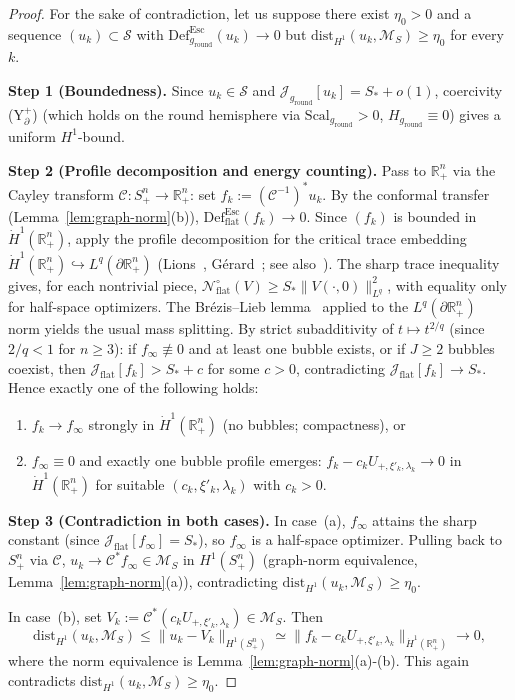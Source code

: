\documentclass[11pt,reqno,a4paper]{amsart}
\newcommand{\R}{\mathbb{R}}
\numberwithin{equation}{section}
\newcommand{\Def}{\mathrm{Def}}
\theoremstyle{plain}
\newcommand{\Scal}{\mathrm{Scal}}
\theoremstyle{remark}
\theoremstyle{plain}
\begin{document}
\begin{proof}
For the sake of contradiction, let us suppose there exist $\eta_0>0$ and a sequence
$(u_k)\subset\mathcal S$ with
$\Def^{\mathrm{Esc}}_{g_{\mathrm{round}}}(u_k)\to0$ but
$\mathrm{dist}_{H^1}(u_k,\mathcal M_S)\ge\eta_0$ for every~$k$.

\smallskip
\noindent\textbf{Step 1 (Boundedness).}
Since $u_k\in\mathcal S$ and
$\mathcal J_{g_{\mathrm{round}}}[u_k]=S_\ast+o(1)$,
coercivity \textup{(Y$^+_{\partial}$)} (which holds on the round
hemisphere via $\Scal_{g_{\mathrm{round}}}>0$,
$H_{g_{\mathrm{round}}}\equiv0$) gives a uniform $H^1$-bound.

\smallskip
\noindent\textbf{Step 2 (Profile decomposition and energy counting).}
Pass to $\R^n_+$ via the Cayley transform $\mathcal C:S^n_+\to\R^n_+$:
set $f_k:=(\mathcal C^{-1})^\ast u_k$.
By the conformal transfer (Lemma~\ref{lem:graph-norm}(b)),
$\Def^{\mathrm{Esc}}_{\mathrm{flat}}(f_k)\to0$.
Since $(f_k)$ is bounded in $\dot H^1(\R^n_+)$,
apply the profile decomposition for the critical trace embedding
$\dot H^1(\R^n_+)\hookrightarrow L^q(\partial\R^n_+)$
(Lions~\cite{Lions85a}, G\'erard~\cite{Gerard98};
see also~\cite[Ch.~3]{TintarevFieseler07}).
The sharp trace inequality gives, for each nontrivial piece,
$\mathcal N^\circ_{\mathrm{flat}}(V)\ge S_\ast\|V(\cdot,0)\|_{L^q}^2$,
with equality only for half-space optimizers.
The Br\'ezis--Lieb lemma~\cite{BrezisLieb83}
applied to the $L^q(\partial\R^n_+)$ norm yields the usual mass splitting.
By strict subadditivity of $t\mapsto t^{2/q}$ (since $2/q<1$ for $n\ge3$):
if $f_\infty\not\equiv0$ and at least one bubble exists, or if
$J\ge2$ bubbles coexist, then
$\mathcal J_{\mathrm{flat}}[f_k]>S_\ast+c$ for some $c>0$,
contradicting $\mathcal J_{\mathrm{flat}}[f_k]\to S_\ast$.
Hence exactly one of the following holds:
\begin{enumerate}[label=(\alph*)]
\item $f_k\to f_\infty$ strongly in $\dot H^1(\R^n_+)$
(no bubbles; compactness), or
\item $f_\infty\equiv0$ and exactly one bubble profile emerges:
$f_k - c_kU_{+,\xi'_k,\lambda_k}\to 0$ in $\dot H^1(\R^n_+)$
for suitable $(c_k,\xi'_k,\lambda_k)$ with $c_k>0$.
\end{enumerate}

\smallskip
\noindent\textbf{Step 3 (Contradiction in both cases).}
In case~(a), $f_\infty$ attains the sharp constant (since
$\mathcal J_{\mathrm{flat}}[f_\infty]=S_\ast$), so $f_\infty$ is a
half-space optimizer.  Pulling back to $S^n_+$ via $\mathcal C$,
$u_k\to\mathcal C^\ast f_\infty\in\mathcal M_S$ in
$H^1(S^n_+)$ (graph-norm equivalence, Lemma~\ref{lem:graph-norm}(a)),
contradicting $\mathrm{dist}_{H^1}(u_k,\mathcal M_S)\ge\eta_0$.

In case~(b), set $V_k:=\mathcal C^\ast(c_kU_{+,\xi'_k,\lambda_k})
\in\mathcal M_S$.
Then
\[
  \mathrm{dist}_{H^1}(u_k,\mathcal M_S)
  \le \|u_k - V_k\|_{H^1(S^n_+)}
  \simeq \|f_k - c_kU_{+,\xi'_k,\lambda_k}\|_{\dot H^1(\R^n_+)}
  \to 0,
\]
where the norm equivalence is Lemma~\ref{lem:graph-norm}(a)-(b).
This again contradicts
$\mathrm{dist}_{H^1}(u_k,\mathcal M_S)\ge\eta_0$.
\end{proof}
\end{document}
